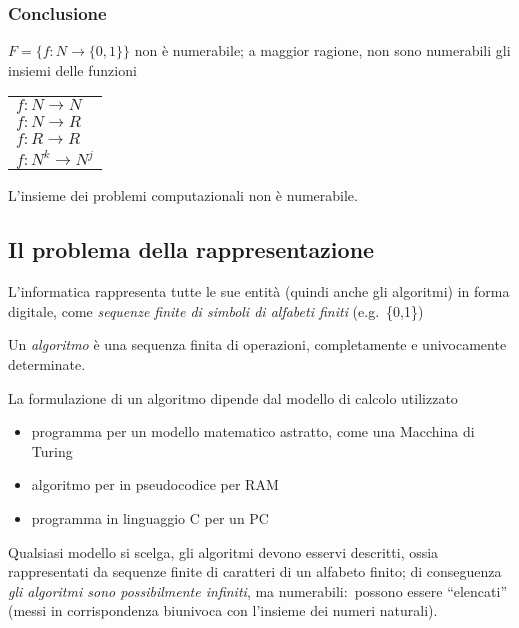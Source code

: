 \subsubsection{Conclusione}

$F = \{f:N \rightarrow \{0,1\}\}$ non è numerabile; a maggior ragione, non sono numerabili gli insiemi delle funzioni

\begin{table}[H]
    \centering
    \begin{tabular}{l}
        $f:N \rightarrow N$     \\
        $f:N \rightarrow R$     \\
        $f:R \rightarrow R$     \\
        $f:N^k \rightarrow N^j$ \\
    \end{tabular}
\end{table}

\noindent L'insieme dei problemi computazionali non è numerabile.\

\subsection{Il problema della rappresentazione}

L'informatica rappresenta tutte le sue entità (quindi anche gli algoritmi) in forma digitale, come \textit{sequenze finite di simboli di alfabeti finiti} (e.g.\ \{0,1\})

\begin{definition}
    Un \textit{algoritmo} è una sequenza finita di operazioni, completamente e univocamente determinate.\
\end{definition}

\noindent La formulazione di un algoritmo dipende dal modello di calcolo utilizzato
\begin{itemize}
    \item programma per un modello matematico astratto, come una Macchina di Turing
    \item algoritmo per in pseudocodice per RAM
    \item programma in linguaggio C per un PC
\end{itemize}

\noindent Qualsiasi modello si scelga, gli algoritmi devono esservi descritti, ossia rappresentati da sequenze finite di caratteri di un alfabeto finito; di conseguenza \textit{gli algoritmi sono possibilmente infiniti}, ma numerabili:\ possono essere ``elencati'' (messi in corrispondenza biunivoca con l'insieme dei numeri naturali).\

